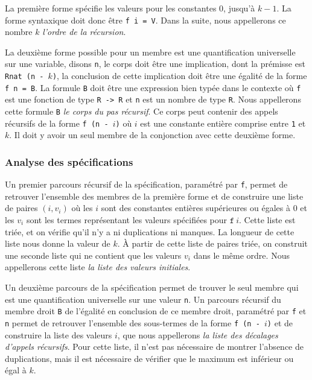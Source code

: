 \documentclass{jflart}
\begin{document}
La première forme spécifie
les valeurs pour les constantes \(0\), jusqu'à \(k - 1\).  La forme
syntaxique doit donc être \texttt{f i = V}.  Dans la suite, nous
appellerons ce nombre \(k\) {\em l'ordre de la récursion}.

La deuxième forme possible
pour un membre est une quantification universelle sur une variable,
disons \texttt{n}, le corps doit être une implication, dont la prémisse
est \texttt{Rnat (n - \(k\))}, la conclusion de cette implication doit être
une égalité de la forme \texttt{f n = B}.  La formule \texttt{B} doit être
une expression bien typée dans le contexte où \texttt{f} est une fonction
de type \texttt{R -> R} et \texttt{n} est un nombre de type \texttt{R}.
Nous appellerons cette formule \texttt{B} {\em le corps du pas récursif}.
Ce corps peut contenir des appels récursifs de
la forme \texttt{f (n - \(i\))} où \(i\) est une constante entière comprise
  entre \texttt{1} et \(k\).  Il doit y avoir un seul membre de la
  conjonction avec cette deuxième forme.

\subsubsection{Analyse des spécifications}
Un premier parcours récursif de la spécification, paramétré par
\texttt{f}, permet de retrouver l'ensemble des membres de la première forme
et de construire une liste de paires \((i, v_i)\) où les \(i\) sont des
constantes entières supérieures ou égales à 0 et les \(v_i\) sont les
termes représentant les valeurs spécifiées pour \(\texttt{f}~i\).  Cette
liste est triée, et on vérifie qu'il n'y a ni duplications ni manques.
La longueur de cette liste nous donne la valeur de \(k\).  À partir
de cette liste de paires triée, on construit une seconde liste qui ne
contient que les valeurs \(v_i\) dans le même ordre.  Nous appellerons
cette liste {\em la liste des valeurs initiales}.

Un deuxième parcours de la spécification permet de trouver le seul
membre qui est une quantification universelle sur une valeur \texttt{n}.
Un parcours récursif du membre droit \texttt{B} de l'égalité en conclusion de
ce membre droit, paramétré par \texttt{f} et \texttt{n}  permet de retrouver
l'ensemble des sous-termes de la forme \texttt{f (n - \(i\))} et de
construire la liste des valeurs \(i\), que nous appellerons {\em la liste des
décalages d'appels récursifs}.  Pour cette liste, il n'est
pas nécessaire de montrer l'absence de duplications, mais il est
nécessaire de vérifier que le maximum est inférieur ou égal à \(k\).
\end{document}

